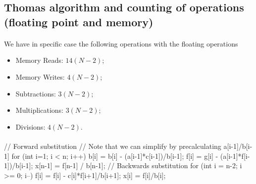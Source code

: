 \documentclass[%
oneside,                 %
final,                   %
10pt]{article}
\begin{document}
\subsection{Thomas algorithm and counting of operations (floating point and memory)}

\paragraph{}

We have in specific case the following operations with the floating operations

\begin{itemize}
\item Memory Reads: $14(N-2)$;

\item Memory Writes: $4(N-2)$; 

\item Subtractions: $3(N-2)$; 

\item Multiplications: $3(N-2)$;

\item Divisions: $4(N-2)$.
\end{itemize}

\noindent




\paragraph{}













\bcppcod
// Forward substitution    
// Note that we can simplify by precalculating a[i-1]/b[i-1]
  for (int i=1; i < n; i++) {
     b[i] = b[i] - (a[i-1]*c[i-1])/b[i-1];
     f[i] = g[i] - (a[i-1]*f[i-1])/b[i-1];
  }
  x[n-1] = f[n-1] / b[n-1];
  // Backwards substitution                                                           
  for (int i = n-2; i >= 0; i--) {
     f[i] = f[i] - c[i]*f[i+1]/b[i+1];
     x[i] = f[i]/b[i];
  }

\ecppcod



\end{document}
